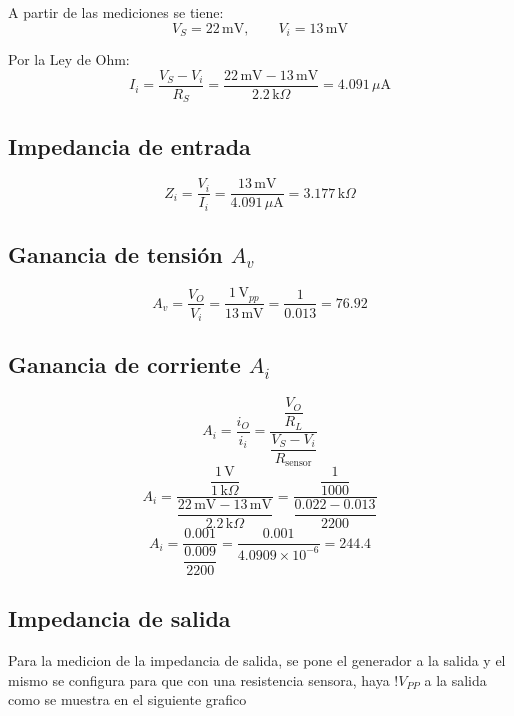     
    \vspace{0.5cm}
    A partir de las mediciones se tiene:
    \[
    V_S = 22\,\text{mV}, \qquad V_i = 13\,\text{mV}
    \]

    Por la Ley de Ohm:
    \[
    I_i = \frac{V_S - V_i}{R_S}
         = \frac{22\,\text{mV} - 13\,\text{mV}}{2.2\,\text{k}\Omega}
         = 4.091\,\mu\text{A}
    \]

    
    \noindent
    \begin{minipage}[t]{0.48\linewidth}
        \subsection*{Impedancia de entrada}
        \[
        Z_i = \frac{V_i}{I_i}
             = \frac{13\,\text{mV}}{4.091\,\mu\text{A}}
             = \boxed{3.177\,\text{k}\Omega}
        \]
    
        \subsection*{Ganancia de tensión $A_v$}
        \[
        A_v=\frac{V_O}{V_i}
             =\frac{1\,\text{V}_{pp}}{13\,\text{mV}}
             =\frac{1}{0.013}
             =\boxed{76.92}
        \]
    \end{minipage}\hfill
    \begin{minipage}[t]{0.48\linewidth}
        \subsection*{Ganancia de corriente $A_i$}
        \[
        A_i=\frac{i_O}{i_i}
            =\frac{\dfrac{V_O}{R_L}}{\dfrac{V_S - V_i}{R_{\text{sensor}}}}
        \]
        \[
        A_i=\frac{\dfrac{1\,\text{V}}{1\,\text{k}\Omega}}{\dfrac{22\,\text{mV}-13\,\text{mV}}{2.2\,\text{k}\Omega}}
            =\frac{\dfrac{1}{1000}}{\dfrac{0.022-0.013}{2200}}
        \]
        \[
        A_i=\frac{0.001}{\dfrac{0.009}{2200}}
            =\frac{0.001}{4.0909\times10^{-6}}
            =\boxed{244.4}
        \]
    \end{minipage}

    
    \subsection{Impedancia de salida}
    Para la medicion de la impedancia de salida, se pone el generador a la salida y el mismo se configura para que con
    una resistencia sensora, haya $!V_{PP}$ a la salida como se muestra en el siguiente grafico

